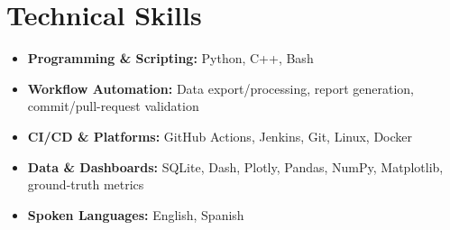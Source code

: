 \section{Technical Skills}
\begin{itemize}[leftmargin=0.15in, label={}, itemsep=0pt, parsep=0pt]
    \small
    \item \textbf{Programming \& Scripting:} Python, C++, Bash
    \item \textbf{Workflow Automation:} Data export/processing, report generation, commit/pull-request validation
    \item \textbf{CI/CD \& Platforms:} GitHub Actions, Jenkins, Git, Linux, Docker
    \item \textbf{Data \& Dashboards:} SQLite, Dash, Plotly, Pandas, NumPy, Matplotlib, ground-truth metrics
    \item \textbf{Spoken Languages:} English, Spanish
\end{itemize}